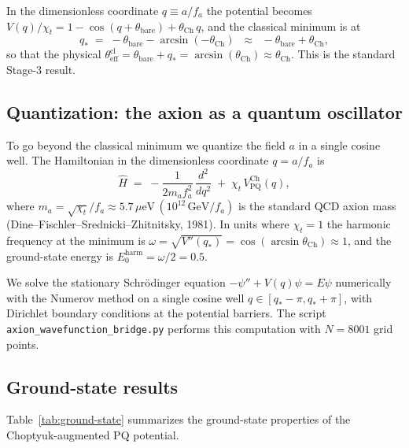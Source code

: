 In the dimensionless coordinate $q \equiv a/f_a$ the potential
becomes $V(q)/\chi_t = 1 - \cos(q + \theta_\mathrm{bare}) + \theta_\mathrm{Ch}\,q$,
and the classical minimum is at
\begin{equation}
q_* \;=\; -\theta_\mathrm{bare} - \arcsin(-\theta_\mathrm{Ch})
\;\;\approx\;\; -\theta_\mathrm{bare} + \theta_\mathrm{Ch},
\end{equation}
so that the physical $\theta_\mathrm{eff}^\mathrm{cl} = \theta_\mathrm{bare} + q_* = \arcsin(\theta_\mathrm{Ch}) \approx \theta_\mathrm{Ch}$.
This is the standard Stage-3 result.

\subsection{Quantization: the axion as a quantum oscillator}

To go beyond the classical minimum we quantize the field $a$ in a
single cosine well.  The Hamiltonian in the dimensionless coordinate
$q = a/f_a$ is
\begin{equation}
\hat H \;=\; -\frac{1}{2 m_a f_a^2}\,\frac{d^2}{dq^2}
\;+\; \chi_t\,V_\mathrm{PQ}^\mathrm{Ch}(q),
\label{eq:Hamiltonian}
\end{equation}
where $m_a = \sqrt{\chi_t}/f_a \approx 5.7\,\mu\mathrm{eV}\,(10^{12}\,\mathrm{GeV}/f_a)$
is the standard QCD axion mass (Dine--Fischler--Srednicki--Zhitnitsky,
1981).  In units where $\chi_t = 1$ the harmonic frequency at the
minimum is $\omega = \sqrt{V''(q_*)} = \cos(\arcsin\theta_\mathrm{Ch}) \approx 1$,
and the ground-state energy is $E_0^\mathrm{harm} = \omega/2 = 0.5$.

We solve the stationary Schr\"odinger equation
$-\psi'' + V(q)\psi = E\psi$ numerically with the Numerov method
on a single cosine well $q \in [q_* - \pi, q_* + \pi]$, with
Dirichlet boundary conditions at the potential barriers.  The
script \texttt{axion\_wavefunction\_bridge.py} performs this
computation with $N = 8001$ grid points.

\subsection{Ground-state results}

Table~\ref{tab:ground-state} summarizes the ground-state properties
of the Choptyuk-augmented PQ potential.

